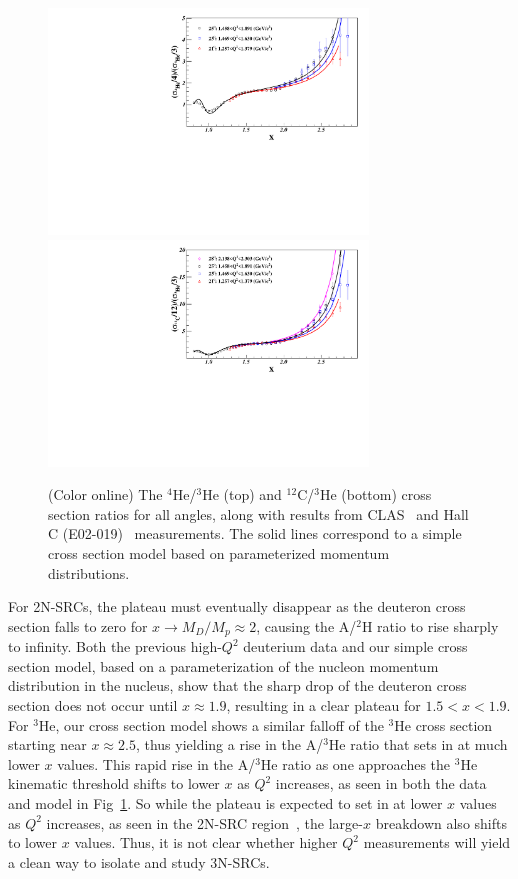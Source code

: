 \documentclass[aps,prl,superscriptaddress,showpacs,twocolumn,floatfix,amsmath,amssymb]{revtex4-1}
\begin{document}
\begin{figure}[!ht]
    \begin{center}
        \includegraphics[width=8.5cm,angle=0]{He4_He3_XS_Ratio_MC}
        \includegraphics[width=8.5cm,angle=0]{C12_He3_XS_Ratio_MC}
    \end{center}
    \vspace*{-6mm}
    \caption{(Color online) The $^4$He/$^3$He (top) and $^{12}$C/$^3$He (bottom) cross section ratios for all angles, 
        along with results from CLAS~\cite{PhysRevLett.96.082501} and Hall C (E02-019)~\cite{fomin2012} measurements. The solid lines
    correspond to a simple cross section model based on parameterized momentum distributions.}
    \label{fig:ratios_allqsq}
\end{figure}

For 2N-SRCs, the plateau must eventually disappear as the deuteron cross section falls to zero for $ x \to
M_D / M_p\approx 2$, causing the A/$^2$H ratio to rise sharply to infinity. Both the previous high-$Q^2$
deuterium data and our simple cross section model, based on a parameterization of the nucleon momentum
distribution in the nucleus, show that the
sharp drop of the deuteron cross section does not occur until $x \approx 1.9$, resulting in a clear plateau
for $1.5 < x < 1.9$. For $^3$He, our cross section model shows a similar falloff of the $^3$He cross section
starting near $x \approx 2.5$, thus yielding a rise in the A/$^3$He ratio that sets in at much lower $x$
values. This rapid rise in the A/$^3$He ratio as one approaches the $^3$He kinematic threshold shifts to
lower $x$ as $Q^2$ increases, as seen in both the data and model in Fig~\ref{fig:ratios_allqsq}. So while
the plateau is expected to set in at lower $x$ values as $Q^2$ increases, as seen in the 2N-SRC
region~\cite{ SLAC_Measurement_PRC.48.2451, PhysRevLett.96.082501}, the large-$x$ breakdown also shifts to
lower $x$ values. Thus, it is not clear whether higher $Q^2$ measurements will yield a clean way to isolate
and study 3N-SRCs.
\end{document}
